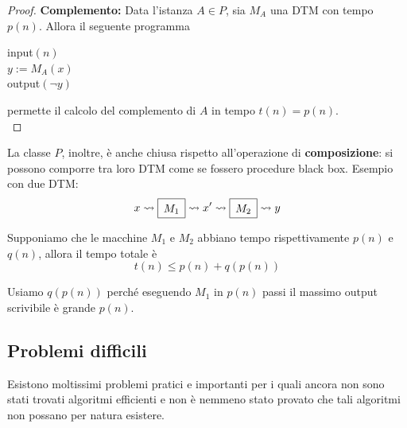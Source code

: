 \begin{proof}
	\textbf{Complemento:} Data l'istanza $A \in P$, sia $M_A$ una DTM con tempo $p(n)$. Allora il seguente programma
	\begin{center}
		\begin{minipage}{.33\textwidth}
			\begin{tcolorbox}[
				colback=white,
				sharp corners,
				boxrule=.3mm,
				left=20pt,
				top=0pt,
				bottom=0pt,
				colbacktitle=white,
				coltitle=black
				]
				\begin{algorithm}[H]
					\SetAlgoNoEnd
					input$(n)$\\
					$y := M_A (x)$\\
					output$(\neg y)$
				\end{algorithm}
			\end{tcolorbox}
		\end{minipage}
	\end{center}
	permette il calcolo del complemento di $A$ in tempo $t(n) = p(n)$.\\
\end{proof}

La classe $P$, inoltre, è anche chiusa rispetto all'operazione di \textbf{composizione}: si possono comporre tra loro DTM come se fossero procedure black box. Esempio con due DTM:
$$ 
\renewcommand{\arraystretch}{1.4}
x \rightsquigarrow \begin{array}{|c|}
	\hline
	M_1 \\
	\hline
\end{array} \rightsquigarrow x' \rightsquigarrow \begin{array}{|c|}
\hline
M_2 \\
\hline
\end{array} \rightsquigarrow y $$

Supponiamo che le macchine $M_1$ e $M_2$ abbiano tempo rispettivamente $p(n)$ e $q(n)$, allora il tempo totale è 
$$ t(n) \leq p(n) + q(p(n)) $$

Usiamo $q(p(n))$ perché eseguendo $M_1$ in $p(n)$ passi il massimo output scrivibile è grande $p(n)$.\\

\subsection{Problemi difficili}

Esistono moltissimi problemi pratici e importanti per i quali ancora non sono stati trovati algoritmi efficienti e non è nemmeno stato provato che tali algoritmi non possano per natura esistere.\\

